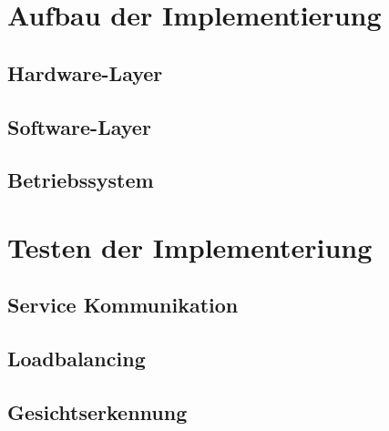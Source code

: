 \section{Aufbau der Implementierung}
\subsection{Hardware-Layer}
\subsection{Software-Layer}
\subsection{Betriebssystem}

\section{Testen der Implementeriung}
\subsection{Service Kommunikation}
\subsection{Loadbalancing}
\subsection{Gesichtserkennung}